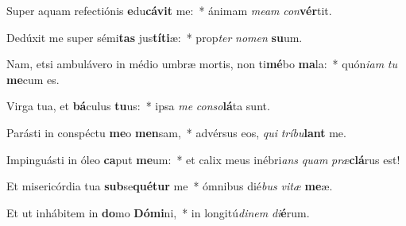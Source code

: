 \item Super aquam refectiónis \textbf{e}du\textbf{cá}\textbf{vit} me:~* ánimam \textit{me}\textit{am} \textit{con}\textbf{vér}tit.
\item Dedúxit me super sémi\textbf{tas} jus\textbf{tí}\textbf{ti}æ:~* prop\textit{ter} \textit{no}\textit{men} \textbf{su}um.
\item Nam, etsi ambulávero in médio umbræ mortis, non ti\textbf{mé}bo \textbf{ma}la:~* quón\textit{i}\textit{am} \textit{tu} \textbf{me}cum es.
\item Virga tua, et \textbf{bá}culus \textbf{tu}us:~* ipsa \textit{me} \textit{con}\textit{so}\textbf{lá}ta sunt.
\item Parásti in conspéctu \textbf{me}o \textbf{men}sam,~* advérsus eos, \textit{qui} \textit{trí}\textit{bu}\textbf{lant} me.
\item Impinguásti in óleo \textbf{ca}put \textbf{me}um:~* et calix meus inébri\textit{ans} \textit{quam} \textit{præ}\textbf{clá}rus est!
\item Et misericórdia tua \textbf{sub}se\textbf{qué}\textbf{tur} me~* ómnibus dié\textit{bus} \textit{vi}\textit{tæ} \textbf{me}æ.
\item Et ut inhábitem in \textbf{do}mo \textbf{Dó}\textbf{mi}ni,~* in longitú\textit{di}\textit{nem} \textit{di}\textbf{é}rum.
